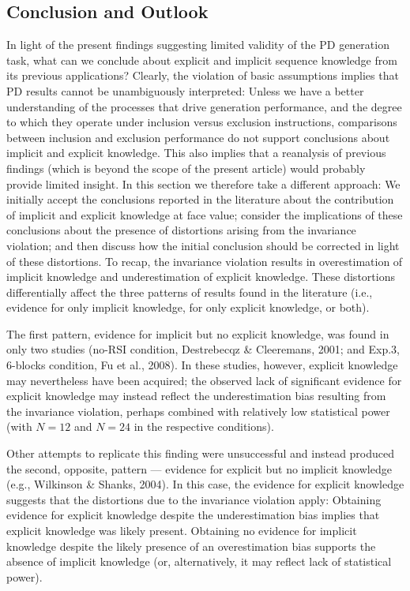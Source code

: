 \documentclass[english,,man]{apa6}
\begin{document}
\hypertarget{conclusion-and-outlook}{%
\subsection{Conclusion and Outlook }\label{conclusion-and-outlook}}

In light of the present findings suggesting limited validity of the PD generation task, what can we conclude about explicit and implicit sequence knowledge from its previous applications?
Clearly, the violation of basic assumptions implies that PD results cannot be unambiguously interpreted:
Unless we have a better understanding of the processes that drive generation performance, and the degree to which they operate under inclusion versus exclusion instructions, comparisons between inclusion and exclusion performance do not support conclusions about implicit and explicit knowledge.
This also implies that a reanalysis of previous findings (which is beyond the scope of the present article) would probably provide limited insight.
In this section we therefore take a different approach:
We initially accept the conclusions reported in the literature about the contribution of implicit and explicit knowledge at face value;
consider the implications of these conclusions about the presence of distortions arising from the invariance violation;
and then discuss how the initial conclusion should be corrected in light of these distortions.
To recap, the invariance violation results in overestimation of implicit knowledge and underestimation of explicit knowledge.
These distortions differentially affect the three patterns of results found in the literature (i.e., evidence for only implicit knowledge, for only explicit knowledge, or both).

The first pattern, evidence for implicit but no explicit knowledge, was found in only two studies (no-RSI condition, Destrebecqz \& Cleeremans, 2001; and Exp.3, 6-blocks condition, Fu et al., 2008).
In these studies, however, explicit knowledge may nevertheless have been acquired;
the observed lack of significant evidence for explicit knowledge may instead reflect the underestimation bias resulting from the invariance violation, perhaps combined with relatively low statistical power (with \(N = 12\) and \(N = 24\) in the respective conditions).

Other attempts to replicate this finding were unsuccessful and instead produced the second, opposite, pattern --- evidence for explicit but no implicit knowledge (e.g., Wilkinson \& Shanks, 2004).
In this case, the evidence for explicit knowledge suggests that the distortions due to the invariance violation apply:
Obtaining evidence for explicit knowledge despite the underestimation bias implies that explicit knowledge was likely present.
Obtaining no evidence for implicit knowledge despite the likely presence of an overestimation bias supports the absence of implicit knowledge (or, alternatively, it may reflect lack of statistical power).
\end{document}
